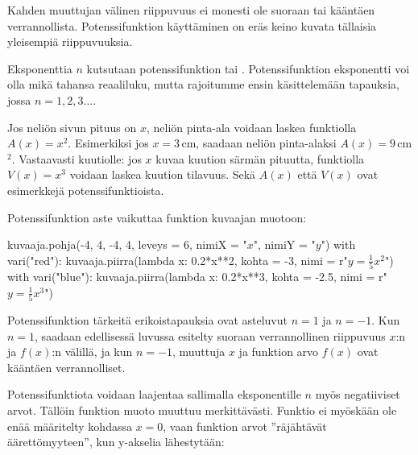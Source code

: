 Kahden muuttujan välinen riippuvuus ei monesti ole suoraan tai kääntäen verrannollista. Potenssifunktion käyttäminen on eräs keino kuvata tällaisia yleisempiä riippuvuuksia.


Eksponenttia $n$ kutsutaan potenssifunktion  tai . Potenssifunktion eksponentti voi olla mikä tahansa reaaliluku, mutta rajoitumme ensin käsittelemään tapauksia, jossa $n = 1, 2, 3\ldots $.

\begin{esimerkki}
Jos neliön sivun pituus on $x$, neliön pinta-ala voidaan laskea funktiolla $A(x)=x^2$. Esimerkiksi jos $x = 3$\,cm, saadaan neliön pinta-alaksi $A(x) = 9$\,cm$^2$. Vastaavasti kuutiolle: jos $x$ kuvaa kuution särmän pituutta, funktiolla $V(x)=x^3$ voidaan laskea kuution tilavuus. Sekä $A(x)$ että $V(x)$ ovat esimerkkejä potenssifunktioista.
\end{esimerkki}

Potenssifunktion aste vaikuttaa funktion kuvaajan muotoon:

\begin{center}
\begin{kuva}
    kuvaaja.pohja(-4, 4, -4, 4, leveys = 6, nimiX = "$x$", nimiY = "$y$")
    with vari("red"): kuvaaja.piirra(lambda x: 0.2*x**2, kohta = -3, nimi = r"$y=\frac{1}{5}x^2$")
    with vari("blue"): kuvaaja.piirra(lambda x: 0.2*x**3, kohta = -2.5, nimi = r"$y=\frac{1}{5}x^3$")
\end{kuva}
\end{center}

Potenssifunktion tärkeitä erikoistapauksia ovat asteluvut $n = 1$ ja $n = -1$. Kun $n = 1$, saadaan edellisessä luvussa esitelty suoraan verrannollinen riippuvuus $x$:n ja $f(x)$:n välillä, ja kun $n = -1$, muuttuja $x$ ja funktion arvo $f(x)$ ovat kääntäen verrannolliset.

Potenssifunktiota voidaan laajentaa sallimalla eksponentille $n$ myös negatiiviset arvot. Tällöin funktion muoto muuttuu merkittävästi. Funktio ei myöskään ole enää määritelty kohdassa $x = 0$, vaan funktion arvot ''räjähtävät äärettömyyteen'', kun y-akselia lähestytään: %

